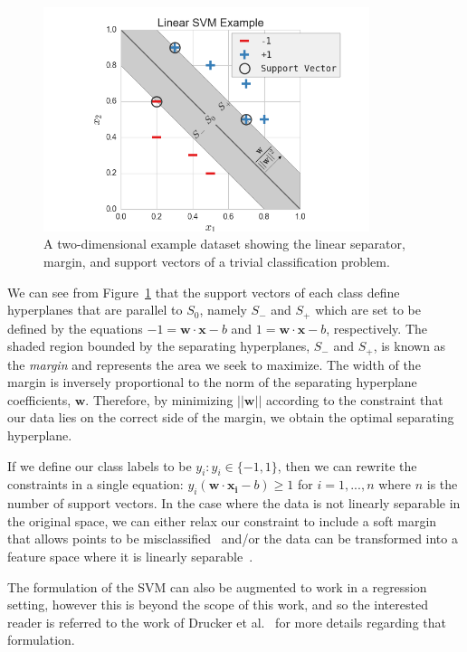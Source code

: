 \begin{figure}[!ht]
  \centering
  \includegraphics[width=0.85\textwidth]{figs/chap3/svmExample}
  \caption[Linear Support Vector Machine Example]{A two-dimensional example dataset showing the linear separator, margin, and support vectors of a trivial classification problem.}
  \label{fig:svmExample}
\end{figure}

We can see from Figure~\ref{fig:svmExample} that the support vectors of each class define hyperplanes that are parallel to $S_0$, namely $S_{-}$ and $S_{+}$ which are set to be defined by the equations $-1 = \mathbf{w} \cdot \mathbf{x} - b$ and $1 = \mathbf{w} \cdot \mathbf{x} - b$, respectively.
%
The shaded region bounded by the separating hyperplanes, $S_{-}$ and $S_{+}$, is known as the \emph{margin} and represents the area we seek to maximize.
%
The width of the margin is inversely proportional to the norm of the separating hyperplane coefficients, $\mathbf{w}$.
%
Therefore, by minimizing $||\mathbf{w}||$ according to the constraint that our data lies on the correct side of the margin, we obtain the optimal separating hyperplane.

If we define our class labels to be $y_i: y_i \in \{-1,1\}$, then we can rewrite the constraints in a single equation: $y_i(\mathbf{w} \cdot \mathbf{x_i} - b ) \geq 1$ for $i=1,...,n$ where $n$ is the number of support vectors.
%
In the case where the data is not linearly separable in the original space, we can either relax our constraint to include a soft margin that allows points to be misclassified~\cite{CortesVapnik1995} and/or the data can be transformed into a feature space where it is linearly separable~\cite{BoserGuyonVapnik1992}.

The formulation of the SVM can also be augmented to work in a regression setting, however this is beyond the scope of this work, and so the interested reader is referred to the work of Drucker et al.~\cite{DruckerBurgesKaufman1997} for more details regarding that formulation.

